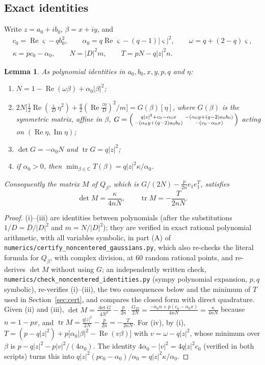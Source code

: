 \documentclass[11pt]{amsart}
\newtheorem{lemma}[theorem]{Lemma}
\theoremstyle{definition}
\newcommand{\C}{\mathbb{C}}
\newcommand{\Rea}{\operatorname{Re}}
\newcommand{\Ima}{\operatorname{Im}}
\begin{document}
\subsection{Exact identities}
Write $z=a_0+ib_0$, $\beta=x+iy$, and
\begin{gather*}
c_0=\Rea\varsigma-qb_0^2,\qquad \alpha_0=q\Rea\varsigma-(q-1)|\varsigma|^2,\qquad \omega=q+(2-q)\varsigma,\\
\kappa=pc_0-\alpha_0,\qquad N=|D|^2m,\qquad T=pN-q|z|^2n .
\end{gather*}
\begin{lemma}\label{lem:identities}
As polynomial identities in $a_0,b_0,x,y,p,q$ and $\eta$:
\begin{enumerate}[label=(\roman*)]
\item $N=1-\Rea(\omega\beta)+\alpha_0|\beta|^2$;
\item $2N\big[\frac12\Rea(\frac\varsigma D\eta^2)+\frac q2(\Rea\frac{z\eta}D)^2/m\big]=G(\beta)[\eta]$, where $G(\beta)$ is
the symmetric matrix, affine in $\beta$,
$G=\begin{psmallmatrix}q|z|^2+c_0-\alpha_0x & -(\alpha_0y+(q-2)a_0b_0)\\ -(\alpha_0y+(q-2)a_0b_0) & -(c_0-\alpha_0x)\end{psmallmatrix}$
acting on $(\Rea\eta,\Ima\eta)$;
\item $\det G=-\alpha_0N$ and $\operatorname{tr}G=q|z|^2$;
\item if $\alpha_0>0$, then $\min_{\beta\in\C}T(\beta)=q|z|^2\kappa/\alpha_0$.
\end{enumerate}
Consequently the matrix $M$ of $Q_\beta$, which is $G/(2N)-\frac p{2n}e_1e_1^{T}$, satisfies
\[
\det M=\frac{\kappa}{4nN},\qquad \operatorname{tr}M=-\frac{T}{2nN}.
\]
\end{lemma}

\begin{proof}
(i)--(iii) are identities between polynomials (after the substitutions $1/D=\overline D/|D|^2$ and $m=N/|D|^2$); they
are verified in exact rational polynomial arithmetic, with all variables symbolic, in part (A) of
\texttt{numerics/\allowbreak certify\_noncentered\_gaussians.py}, which also re-checks the literal formula for
$Q_\beta$, with complex division, at $60$ random rational points, and re-derives $\det M$ without using $G$; an
independently written check, \texttt{numerics/\allowbreak check\_noncentered\_identities.py} (sympy polynomial
expansion, $p,q$ symbolic), re-verifies (i)--(iii), the two consequences below and the minimum of $T$ used in
Section~\ref{sec:cert}, and compares the closed form with direct quadrature. Given
(ii) and (iii), $\det M=\frac{\det G}{4N^2}-\frac p{2n}\cdot\frac{G_{22}}{2N}=\frac{-\alpha_0n+p(c_0-\alpha_0x)}{4nN}
=\frac{\kappa}{4nN}$ because $n=1-px$, and $\operatorname{tr}M=\frac{q|z|^2}{2N}-\frac p{2n}=-\frac T{2nN}$. For (iv),
by (i), $T=(p-q|z|^2)+p\big[\alpha_0|\beta|^2-\Rea(v\beta)\big]$ with $v=\omega-q|z|^2$, whose minimum over $\beta$ is
$p-q|z|^2-p|v|^2/(4\alpha_0)$. The identity $4\alpha_0-|v|^2=4q|z|^2c_0$ (verified in both scripts) turns this into
$q|z|^2(pc_0-\alpha_0)/\alpha_0=q|z|^2\kappa/\alpha_0$.
\end{proof}
\end{document}
